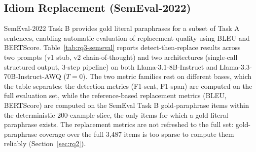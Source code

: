 \subsection{Idiom Replacement (SemEval-2022)}

SemEval-2022 Task B provides gold literal paraphrases for a subset of Task A sentences, enabling automatic evaluation of replacement quality using BLEU and BERTScore. Table~\ref{tab:rq3-semeval} reports detect-then-replace results across two prompts (v1 stub, v2 chain-of-thought) and two architectures (single-call structured output, 3-step pipeline) on both Llama-3.1-8B-Instruct and Llama-3.3-70B-Instruct-AWQ ($T=0$). The two metric families rest on different bases, which the table separates: the detection metrics (F1-sent, F1-span) are computed on the full evaluation set, while the reference-based replacement metrics (BLEU, BERTScore) are computed on the SemEval Task B gold-paraphrase items within the deterministic 200-example slice, the only items for which a gold literal paraphrase exists. The replacement metrics are not refreshed to the full set: gold-paraphrase coverage over the full 3{,}487 items is too sparse to compute them reliably (Section~\ref{sec:rq2}).

